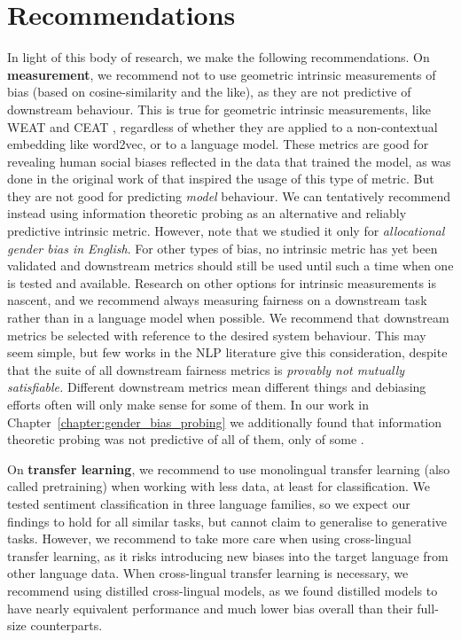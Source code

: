 \section{Recommendations}
In light of this body of research, we make the following recommendations. On \textbf{measurement}, we recommend not to use geometric intrinsic measurements of bias (based on cosine-similarity and the like), as they are not predictive of downstream behaviour. This is true for geometric intrinsic measurements, like WEAT \citep{} and CEAT \citep{}, regardless of whether they are applied to a non-contextual embedding like word2vec, or to a language model. These metrics are good for revealing human social biases reflected in the data that trained the model, as was done in the original work of \citet{Caliskan2017SemanticsDA} that inspired the usage of this type of metric. But they are not good for predicting \textit{model} behaviour. We can tentatively recommend instead using information theoretic probing as an alternative and reliably predictive intrinsic metric. However, note that we studied it only for \textit{allocational gender bias in English}. For other types of bias, no intrinsic metric has yet been validated and downstream metrics should still be used until such a time when one is tested and available. Research on other options for intrinsic measurements is nascent, and we recommend always measuring fairness on a downstream task rather than in a language model when possible.
We recommend that downstream metrics be selected with reference to the desired system behaviour. This may seem simple, but few works in the NLP literature give this consideration, despite that the suite of all downstream fairness metrics is \textit{provably not mutually satisfiable.} Different downstream metrics mean different things  and debiasing efforts often will only make sense for some of them. In our work in Chapter~\ref{chapter:gender_bias_probing} we additionally found that information theoretic probing was not predictive of all of them, only of some .


On \textbf{transfer learning}, we recommend to use monolingual transfer learning (also called pretraining) when working with less data, at least for classification. We tested sentiment classification in three language families, so we expect our findings to hold for all similar tasks, but cannot claim to generalise to generative tasks.
However, we recommend to take more care when using cross-lingual transfer learning, as it risks introducing new biases into the target language from other language data. When cross-lingual transfer learning is necessary, we recommend using distilled cross-lingual models, as we found distilled models to have nearly equivalent performance and much lower bias overall than their full-size counterparts.


